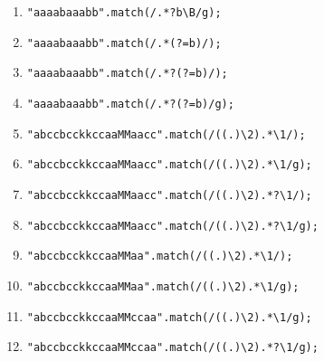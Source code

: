\documentclass[a4j,12pt]{jarticle}
\begin{document}
{\begin{Prob}
\begin{enumerate}
 \item \texttt{"aaaabaaabb".match(/.*?b\textbackslash B/g);}\vspace{\baselineskip}
 \item \texttt{"aaaabaaabb".match(/.*(?=b)/);}\vspace{\baselineskip}
 \item \texttt{"aaaabaaabb".match(/.*?(?=b)/);}
\vspace{\baselineskip}
 \item \texttt{"aaaabaaabb".match(/.*?(?=b)/g);}
\vspace{\baselineskip}
 \item \texttt{"abccbcckkccaaMMaacc".match(/((.)\textbackslash2).*\textbackslash1/);}\vspace{\baselineskip}
 \item \texttt{"abccbcckkccaaMMaacc".match(/((.)\textbackslash2).*\textbackslash1/g);}\vspace{\baselineskip}
 \item \texttt{"abccbcckkccaaMMaacc".match(/((.)\textbackslash2).*?\textbackslash1/);}\vspace{\baselineskip}
 \item \texttt{"abccbcckkccaaMMaacc".match(/((.)\textbackslash2).*?\textbackslash1/g);}\vspace{\baselineskip}
 \item \texttt{"abccbcckkccaaMMaa".match(/((.)\textbackslash2).*\textbackslash1/);}\vspace{\baselineskip}
 \item \texttt{"abccbcckkccaaMMaa".match(/((.)\textbackslash2).*\textbackslash1/g);}\vspace{\baselineskip}
 \item \texttt{"abccbcckkccaaMMccaa".match(/((.)\textbackslash2).*\textbackslash1/g);}\vspace{\baselineskip}
 \item \texttt{"abccbcckkccaaMMccaa".match(/((.)\textbackslash2).*?\textbackslash1/g);}\vspace{\baselineskip}
%
\end{enumerate}
\end{Prob}
}
\end{document}
